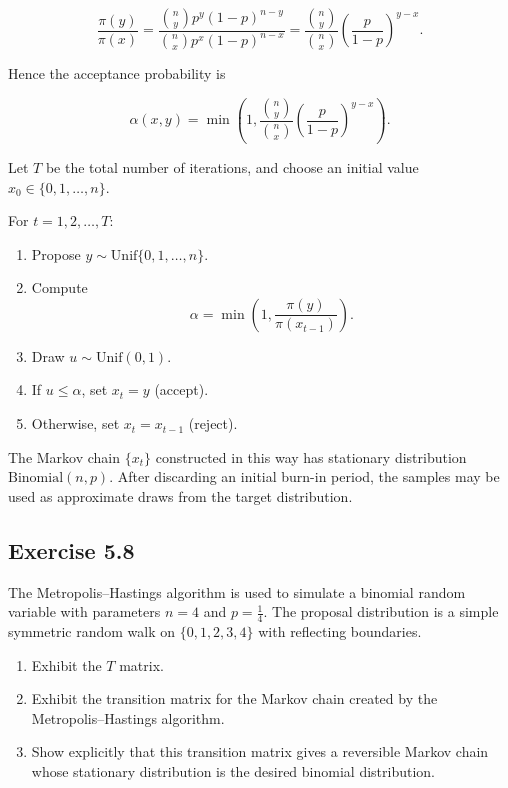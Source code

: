 \documentclass[hidelinks]{article}
\begin{document}
\[
\frac{\pi(y)}{\pi(x)}
=
\frac{
\binom{n}{y} p^y (1-p)^{n-y}
}{
\binom{n}{x} p^x (1-p)^{n-x}
}
=
\frac{\binom{n}{y}}{\binom{n}{x}}
\left( \frac{p}{1-p} \right)^{y-x}.
\]

\noindent Hence the acceptance probability is

\[
\boxed{
\alpha(x,y)
=
\min\left(
1,
\frac{\binom{n}{y}}{\binom{n}{x}}
\left( \frac{p}{1-p} \right)^{y-x}
\right).
}
\]

\noindent Let $T$ be the total number of iterations, and choose an initial value 
$x_0 \in \{0,1,\dots,n\}$.

\noindent For $t = 1,2,\dots,T$:

\begin{enumerate}
    \item Propose $y \sim \text{Unif}\{0,1,\dots,n\}$.
    \item Compute
    \[
    \alpha
    =
    \min\left(
    1,
    \frac{\pi(y)}{\pi(x_{t-1})}
    \right).
    \]
    \item Draw $u \sim \text{Unif}(0,1)$.
    \item If $u \le \alpha$, set $x_t = y$ (accept).
    \item Otherwise, set $x_t = x_{t-1}$ (reject).
\end{enumerate}

\noindent The Markov chain $\{x_t\}$ constructed in this way has stationary 
distribution $\text{Binomial}(n,p)$. After discarding an initial burn-in 
period, the samples may be used as approximate draws from the target 
distribution.

\subsection{Exercise 5.8}

The Metropolis--Hastings algorithm is used to simulate a binomial random variable with parameters
$n=4$ and $p=\tfrac14$. The proposal distribution is a simple symmetric random walk on
$\{0,1,2,3,4\}$ with reflecting boundaries.
\begin{enumerate}
  \item[(a)] Exhibit the $T$ matrix.
  \item[(b)] Exhibit the transition matrix for the Markov chain created by the Metropolis--Hastings algorithm.
  \item[(c)] Show explicitly that this transition matrix gives a reversible Markov chain whose stationary
  distribution is the desired binomial distribution.
\end{enumerate}
\end{document}

